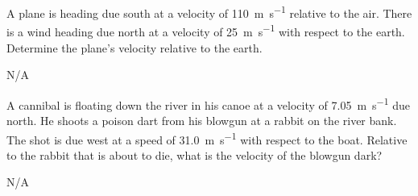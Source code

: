 \begin{question}[ID=relative-C-Q03,topic=relative-motion,difficulty=C]
    A plane is heading  due south at a velocity of
        \SI{110}{\meter\per\second} relative to the air.
    There is a wind heading due north at a velocity of
        \SI{25}{\meter\per\second} with respect to the earth.
    Determine the plane's velocity relative to the earth.
\end{question}
\begin{solution}
    N/A
\end{solution}


\begin{question}[ID=relative-C-Q04,topic=relative-motion,difficulty=C]
    A cannibal is floating down the river in his canoe at a velocity
        of \SI{7.05}{\meter\per\second} due north.
    He shoots a poison dart from his blowgun at a rabbit on the river
        bank.
    The shot is due west at a speed of \SI{31.0}{\meter\per\second}
        with respect to the boat.
    Relative to the rabbit that is about to die, what is the
        velocity of the blowgun dark?
\end{question}
\begin{solution}
    N/A
\end{solution}


\endinput

